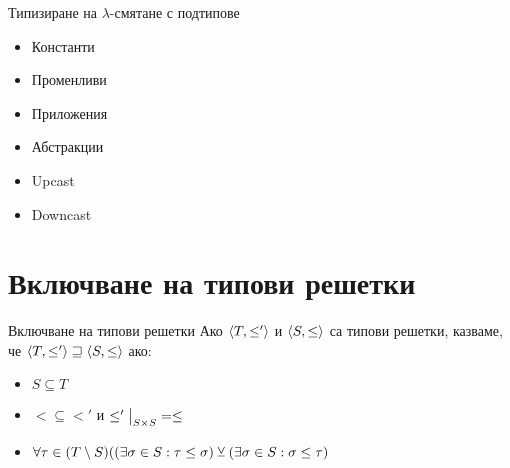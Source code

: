 \documentclass[9pt]{beamer}
\begin{document}
  \begin{frame}{Типизиране на $\lambda$-смятане с подтипове}
    \begin{itemize}
        \item Константи
        \item Променливи
        \item Приложения
        \item Абстракции
        \item Upcast
        \item Downcast
    \end{itemize}
  \end{frame}

  \section{Включване на типови решетки}

  \begin{frame}{Включване на типови решетки}
    Ако $\langle  T,  \leq'  \rangle$ и $\langle  S,  \leq  \rangle$
    са типови решетки, казваме, че
    $\langle  T,  \leq'  \rangle \sqsupseteq \langle  S,  \leq  \rangle$ ако:
    \begin{itemize}
        \item $S \subseteq T$
        \item $\less \subseteq \less'$ и $\restr{\less'}{S \times S} = \less$
        \item $\forall \tau \in (T \setminus S) ((\exists \sigma \in S : \tau \leq \sigma )
            \veebar (\exists \sigma \in S : \sigma \leq \tau)$
    \end{itemize}
  \end{frame}
\end{document}
